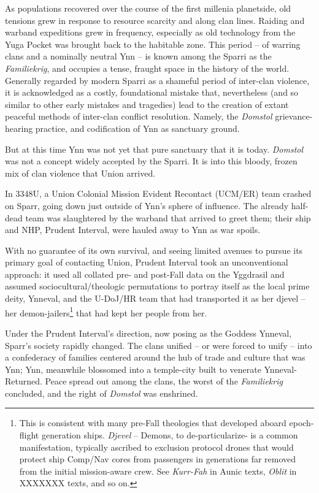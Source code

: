 As populations recovered over the course of the first millenia planetside, old tensions grew in
response to resource scarcity and along clan lines. Raiding and warband expeditions grew in
frequency, especially as old technology from the Yuga Pocket was brought back to the habitable
zone. This period -- of warring clans and a nominally neutral Ynn -- is known among the Sparri as
the \textit{Familiekrig}, and occupies a tense, fraught space in the history of the world. Generally
regarded by modern Sparri as a shameful period of inter-clan violence, it is acknowledged as a
costly, foundational mistake that, nevertheless (and so similar to other early mistakes and
tragedies) lead to the creation of extant peaceful methods of inter-clan conflict resolution. Namely,
the \textit{Domstol} grievance-hearing practice, and codification of Ynn as sanctuary ground.

But at this time Ynn was not yet that pure sanctuary that it is today. \textit{Domstol} was not a concept
widely accepted by the Sparri. It is into this bloody, frozen mix of clan violence that Union arrived.

In 3348U, a Union Colonial Mission Evident Recontact (UCM/ER) team crashed on Sparr, going
down just outside of Ynn's sphere of influence. The already half-dead team was slaughtered by
the warband that arrived to greet them; their ship and NHP, Prudent Interval, were hauled away to
Ynn as war spoils.

With no guarantee of its own survival, and seeing limited avenues to pursue its primary goal of
contacting Union, Prudent Interval took an unconventional approach: it used all collated pre-  and
post-Fall data on the Yggdrasil and assumed sociocultural/theologic permutations to portray itself
as the local prime deity, Ynneval, and the U-DoJ/HR team that had transported it as her djevel --
her demon-jailers\footnote{This is consistent with many pre-Fall theologies that developed aboard epoch-flight generation ships. \textit{Djevel} --
Demons, to de-particularize- is a common manifestation, typically ascribed to exclusion protocol drones that would
protect ship Comp/Nav cores from passengers in generations far removed from the initial mission-aware crew. See
\textit{Kurr-Fah} in Aunic texts, \textit{Oblit} in XXXXXXX texts, and so on.} that had kept her people from her.

Under the Prudent Interval's direction, now posing as the Goddess Ynneval, Sparr's society
rapidly changed. The clans unified -- or were forced to unify -- into a confederacy of families
centered around the hub of trade and culture that was Ynn; Ynn, meanwhile blossomed into a
temple-city built to venerate Ynneval-Returned. Peace spread out among the clans, the worst of
the \textit{Familiekrig} concluded, and the right of \textit{Domstol} was enshrined.

